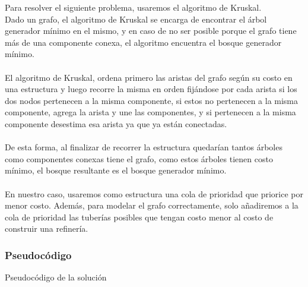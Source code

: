 Para resolver el siguiente problema, usaremos el algoritmo de Kruskal. \\
Dado un grafo, el algoritmo de Kruskal se encarga de encontrar el árbol generador mínimo en el mismo, y en caso de no ser posible porque el grafo tiene más de una componente conexa, el algoritmo encuentra el bosque generador mínimo. \\
\\
El algoritmo de Kruskal, ordena primero las aristas del grafo según su costo en una estructura y luego recorre la misma en orden fijándose por cada arista si los dos nodos pertenecen a la misma componente, si estos no pertenecen a la misma componente, agrega la arista y une las componentes, y si pertenecen a la misma componente desestima esa arista ya que ya están conectadas. \\
\\
De esta forma, al finalizar de recorrer la estructura quedarían tantos árboles como componentes conexas tiene el grafo, como estos árboles tienen costo mínimo, el bosque resultante es el bosque generador mínimo.  \\
\\
En nuestro caso, usaremos como estructura una cola de prioridad que priorice por menor costo. Además, para modelar el grafo correctamente, solo añadiremos a la cola de prioridad las tuberías posibles que tengan costo menor al costo de construir una refinería.


\subsubsection{Pseudocódigo}

Pseudocódigo de la solución

